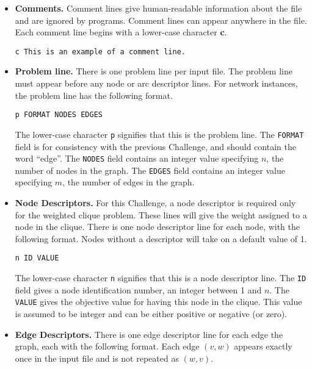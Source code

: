 \begin{itemize}

\item {\bf Comments.} Comment lines give human-readable 
information about the file and are ignored by programs.  Comment lines
can appear anywhere in the file.  Each comment line begins with a
lower-case character {\bf c}.
\begin{verbatim} 
c This is an example of a comment line.
\end{verbatim} 

\item {\bf Problem line.}  There is one problem line per input file.  The 
problem line must appear before any node or arc descriptor lines.  For
network instances, the problem line has the following format.
\begin{verbatim}
p FORMAT NODES EDGES
\end{verbatim} 
The lower-case character {\tt p} signifies that this is the problem
line.  The {\tt FORMAT} field is for consistency with the previous
Challenge, and should contain the word ``edge''.
The {\tt NODES} field contains an integer value
specifying $n$, the number of nodes in the graph.  The {\tt EDGES}
field contains an integer value specifying $m$, the number of edges in
the graph.

\item {\bf Node Descriptors.}   
For this Challenge, a node descriptor is required only for the
weighted clique problem.  These lines will give the weight assigned to
a node in the clique.  There is one node descriptor line for each
node, with the following format.  Nodes without a descriptor will take
on a default value of 1.

\begin{verbatim}
n ID VALUE
\end{verbatim}

The lower-case character {\tt n} signifies that this is a node
descriptor line.  The {\tt ID} field gives a node identification
number, an integer between 1 and $n$.  The {\tt VALUE} gives the
objective value for having this node in the clique.  This value is
assumed to be integer and can be either positive or negative (or zero).


\item {\bf Edge Descriptors.} There is one edge descriptor
line for each edge the graph, each with the following format.  Each 
edge $(v,w)$ appears exactly once in the
input file and is not repeated as $(w,v)$. 


\end{itemize}
